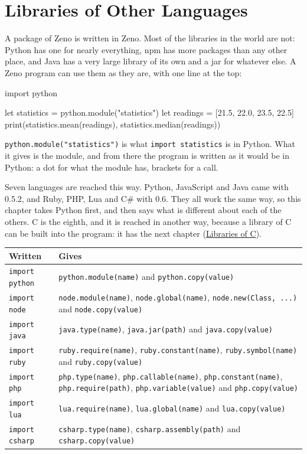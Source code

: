 \chapter{Libraries of Other Languages}\label{ch-other-languages}

A package of Zeno is written in Zeno. Most of the libraries in the
world are not: Python has one for nearly everything, npm has more
packages than any other place, and Java has a very large library of
its own and a jar for whatever else. A Zeno program can use them as
they are, with one line at the top:

\begin{zeno}[file=mean.zeno]
import python

let statistics = python.module("statistics")
let readings = [21.5, 22.0, 23.5, 22.5]
print(statistics.mean(readings), statistics.median(readings))
\end{zeno}

\verb|python.module("statistics")| is what \verb|import statistics|
is in Python. What it gives is the module, and from there the program
is written as it would be in Python: a dot for what the module has,
brackets for a call.

Seven languages are reached this way. Python, JavaScript and Java
came with 0.5.2, and Ruby, PHP, Lua and C\# with 0.6. They all work
the same way, so this chapter takes Python first, and then says what
is different about each of the others. C is the eighth, and it is
reached in another way, because a library of C can be built into the
program: it has the next chapter (\hyperref[ch-c-libraries]{Libraries of C}).

\begin{center}
\begin{tabular}{lP{7.4cm}}
\toprule
Written & Gives \\
\midrule
\verb|import python| & \verb|python.module(name)| and \verb|python.copy(value)| \\
\verb|import node| & \verb|node.module(name)|, \verb|node.global(name)|,
  \verb|node.new(Class, ...)| and \verb|node.copy(value)| \\
\verb|import java| & \verb|java.type(name)|, \verb|java.jar(path)| and
  \verb|java.copy(value)| \\
\verb|import ruby| & \verb|ruby.require(name)|, \verb|ruby.constant(name)|,
  \verb|ruby.symbol(name)| and \verb|ruby.copy(value)| \\
\verb|import php| & \verb|php.type(name)|, \verb|php.callable(name)|,
  \verb|php.constant(name)|, \verb|php.require(path)|,
  \verb|php.variable(value)| and \verb|php.copy(value)| \\
\verb|import lua| & \verb|lua.require(name)|, \verb|lua.global(name)|
  and \verb|lua.copy(value)| \\
\verb|import csharp| & \verb|csharp.type(name)|,
  \verb|csharp.assembly(path)| and \verb|csharp.copy(value)| \\
\bottomrule
\end{tabular}
\end{center}

